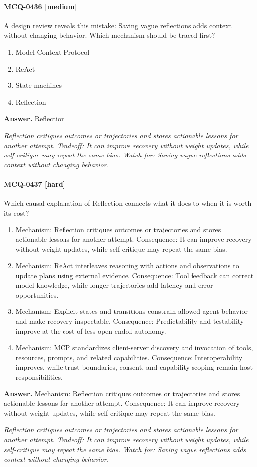 \paragraph{MCQ-0436 [medium]} A design review reveals this mistake: Saving vague reflections adds context without changing behavior. Which mechanism should be traced first?
\begin{enumerate}[label=\Alph*.]
\item Model Context Protocol
\item ReAct
\item State machines
\item Reflection
\end{enumerate}
\noindent\textbf{Answer.} Reflection
\par\textit{Reflection critiques outcomes or trajectories and stores actionable lessons for another attempt. Tradeoff: It can improve recovery without weight updates, while self-critique may repeat the same bias. Watch for: Saving vague reflections adds context without changing behavior.}
\paragraph{MCQ-0437 [hard]} Which causal explanation of Reflection connects what it does to when it is worth its cost?
\begin{enumerate}[label=\Alph*.]
\item Mechanism: Reflection critiques outcomes or trajectories and stores actionable lessons for another attempt. Consequence: It can improve recovery without weight updates, while self-critique may repeat the same bias.
\item Mechanism: ReAct interleaves reasoning with actions and observations to update plans using external evidence. Consequence: Tool feedback can correct model knowledge, while longer trajectories add latency and error opportunities.
\item Mechanism: Explicit states and transitions constrain allowed agent behavior and make recovery inspectable. Consequence: Predictability and testability improve at the cost of less open-ended autonomy.
\item Mechanism: MCP standardizes client-server discovery and invocation of tools, resources, prompts, and related capabilities. Consequence: Interoperability improves, while trust boundaries, consent, and capability scoping remain host responsibilities.
\end{enumerate}
\noindent\textbf{Answer.} Mechanism: Reflection critiques outcomes or trajectories and stores actionable lessons for another attempt. Consequence: It can improve recovery without weight updates, while self-critique may repeat the same bias.
\par\textit{Reflection critiques outcomes or trajectories and stores actionable lessons for another attempt. Tradeoff: It can improve recovery without weight updates, while self-critique may repeat the same bias. Watch for: Saving vague reflections adds context without changing behavior.}
